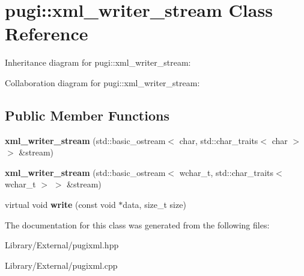 \hypertarget{classpugi_1_1xml__writer__stream}{}\section{pugi\+:\+:xml\+\_\+writer\+\_\+stream Class Reference}
\label{classpugi_1_1xml__writer__stream}


Inheritance diagram for pugi\+:\+:xml\+\_\+writer\+\_\+stream\+:


Collaboration diagram for pugi\+:\+:xml\+\_\+writer\+\_\+stream\+:
\subsection*{Public Member Functions}
\begin{DoxyCompactItemize}
\item 
\hypertarget{classpugi_1_1xml__writer__stream_a259c28368c08378e15cf28b35a1dcd9a}{}{\bfseries xml\+\_\+writer\+\_\+stream} (std\+::basic\+\_\+ostream$<$ char, std\+::char\+\_\+traits$<$ char $>$ $>$ \&stream)\label{classpugi_1_1xml__writer__stream_a259c28368c08378e15cf28b35a1dcd9a}

\item 
\hypertarget{classpugi_1_1xml__writer__stream_afa342cf0bb3a0bd6ee3d47550ad23333}{}{\bfseries xml\+\_\+writer\+\_\+stream} (std\+::basic\+\_\+ostream$<$ wchar\+\_\+t, std\+::char\+\_\+traits$<$ wchar\+\_\+t $>$ $>$ \&stream)\label{classpugi_1_1xml__writer__stream_afa342cf0bb3a0bd6ee3d47550ad23333}

\item 
\hypertarget{classpugi_1_1xml__writer__stream_a3ec185992d56341f6ee8d1037a6efb17}{}virtual void {\bfseries write} (const void $\ast$data, size\+\_\+t size)\label{classpugi_1_1xml__writer__stream_a3ec185992d56341f6ee8d1037a6efb17}

\end{DoxyCompactItemize}


The documentation for this class was generated from the following files\+:\begin{DoxyCompactItemize}
\item 
Library/\+External/pugixml.\+hpp\item 
Library/\+External/pugixml.\+cpp\end{DoxyCompactItemize}
